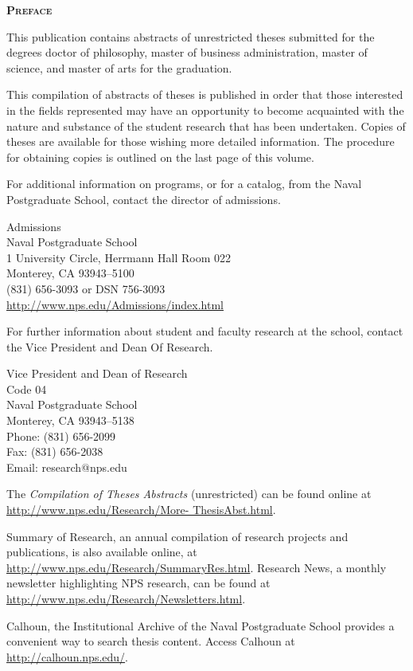 
\begin{center}
\textbf{\textsc{\textbf{Preface}}}
\end{center}

This publication contains abstracts of unrestricted theses submitted for the degrees doctor of philosophy, master of business administration, master of science, and master of arts for the \graddate{} graduation.

This compilation of abstracts of theses is published in order that those interested in the fields represented may have an opportunity to become acquainted with the nature and substance of the student research that has been undertaken. Copies of theses are available for those wishing more detailed information. The procedure for obtaining copies is outlined on the last page of this volume.

For additional information on programs, or for a catalog, from the Naval Postgraduate School, contact the director of admissions.


\begin{center}
Admissions \\
Naval Postgraduate School \\
1 University Circle, Herrmann Hall Room 022 \\
Monterey, CA 93943--5100 \\
(831) 656-3093 or DSN 756-3093\\
\url{http://www.nps.edu/Admissions/index.html}
\end{center}

For further information about student and faculty research at the school, contact the Vice President and Dean Of Research.

\begin{center}
Vice President and Dean of Research \\
Code 04 \\
Naval Postgraduate School \\
Monterey, CA 93943--5138 \\
Phone: (831) 656-2099 \\
Fax: (831) 656-2038 \\
Email: research@nps.edu
\end{center}

The \textit{Compilation of Theses Abstracts} (unrestricted) can be found online at \url{http://www.nps.edu/Research/More- ThesisAbst.html}.

Summary of Research, an annual compilation of research projects and publications, is also available online, at \url{http://www.nps.edu/Research/SummaryRes.html}. Research News, a monthly newsletter highlighting NPS research, can be found at \url{http://www.nps.edu/Research/Newsletters.html}.

Calhoun, the Institutional Archive of the Naval Postgraduate School provides a convenient way to search thesis content. Access Calhoun at \url{http://calhoun.nps.edu/}.